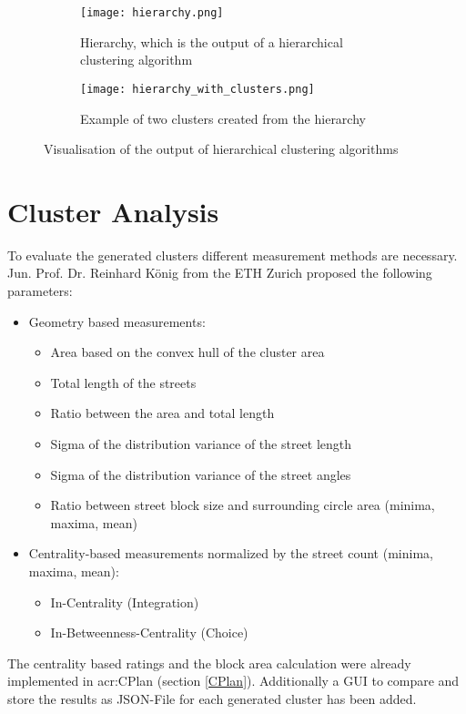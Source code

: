 \begin{figure}[!hb]
    \centering
    \begin{subfigure}[b]{\textwidth}
        \begin{mdframed}[style=border]
            \texttt{[image: hierarchy.png]}
        \end{mdframed}
        \caption{Hierarchy, which is the output of a hierarchical clustering algorithm}
        \label{fig:hierarchy}
    \end{subfigure}
    \par\medskip
    \begin{subfigure}[b]{\textwidth}
        \begin{mdframed}[style=border]
            \texttt{[image: hierarchy\_with\_clusters.png]}
        \end{mdframed}
        \caption{Example of two clusters created from the hierarchy}
        \label{fig:hierarchy_with_clusters}
    \end{subfigure}
    \caption{Visualisation of the output of hierarchical clustering algorithms}
\end{figure}


\section{Cluster Analysis}
\label{sec:clusterRating}
To evaluate the generated clusters different measurement methods are necessary. Jun. Prof. Dr. Reinhard König from the ETH Zurich proposed the following parameters:

\begin{itemize}
    \item Geometry based measurements:
    \begin{itemize}
        \item Area based on the convex hull of the cluster area
        \item Total length of the streets
        \item Ratio between the area and total length
        \item Sigma of the distribution variance of the street length
        \item Sigma of the distribution variance of the street angles
        \item Ratio between street block size and surrounding circle area (minima, maxima, mean)
    \end{itemize}
    \item Centrality-based measurements normalized by the street count (minima, maxima, mean):
    \begin{itemize}
        \item In-Centrality (Integration)
        \item In-Betweenness-Centrality (Choice)
    \end{itemize}
\end{itemize}
The centrality based ratings and the block area calculation were already implemented in \acrshort{acr:CPlan} (section \ref{CPlan}). Additionally a GUI to compare and store the results as JSON-File for each generated cluster has been added.

